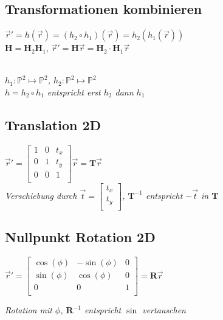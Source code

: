 \subsection{Transformationen kombinieren}

$\vec{r} ' = h(\vec{r}) = (h_2 \circ h_1)(\vec{r}) = h_2(h_1(\vec{r}))$\\

$\mathbf{H} = \mathbf{H}_2\mathbf{H}_1$,
$\vec{r} ' = \mathbf{H}\vec{r} = \mathbf{H}_2 \cdot \mathbf{H}_1\vec{r}$

\textit{\\
    $h_1: \mathbb{P}^2 \mapsto \mathbb{P}^2$,
    $h_2: \mathbb{P}^2 \mapsto \mathbb{P}^2$ \\
    $h = h_2 \circ h_1$ entspricht erst $h_2$ dann $h_1$
}

\subsection{Translation 2D}

$\vec{r} ' = \left[\begin{array}{cc|c}
    1 & 0 & t_x \\
    0 & 1 & t_y \\
    \hline
    0 & 0 & 1 \\
\end{array}\right]
\vec{r} = \mathbf{T} \vec{r}$ \\

\textit{Verschiebung durch $\vec{t} = \begin{bmatrix}
    t_x \\
    t_y \\
\end{bmatrix}$, $\mathbf{T}^{-1}$ entspricht $-\vec{t}$ in $\mathbf{T}$}

\subsection{Nullpunkt Rotation 2D}

$\vec{r}' = \left[\begin{array}{cc|c}
    \cos(\phi) & -\sin(\phi) & 0 \\
    \sin(\phi) & \cos(\phi) & 0 \\
    \hline
    0 & 0 & 1 \\
\end{array}\right] = \mathbf{R} \vec{r}$

\textit{Rotation mit $\phi$, $\mathbf{R}^{-1}$
entspricht $\sin$ vertauschen}

